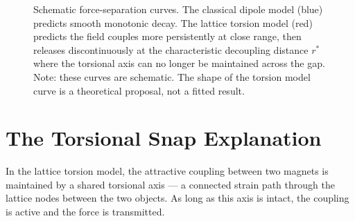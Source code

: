 \documentclass[11pt, letterpaper, openany]{book}
\begin{document}
\begin{figure}[H]
\centering
{}
\caption{Schematic force-separation curves. The classical dipole model
(blue) predicts smooth monotonic decay. The lattice torsion model (red)
predicts the field couples more persistently at close range, then
releases discontinuously at the characteristic decoupling distance
$r^*$ where the torsional axis can no longer be maintained across
the gap. Note: these curves are schematic. The shape of the torsion
model curve is a theoretical proposal, not a fitted result.}
\end{figure}

\section{The Torsional Snap Explanation}

In the lattice torsion model, the attractive coupling between two magnets
is maintained by a shared torsional axis — a connected strain path through
the lattice nodes between the two objects. As long as this axis is intact,
the coupling is active and the force is transmitted.
\end{document}
